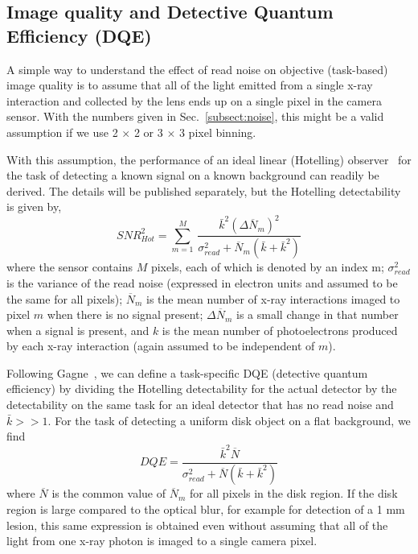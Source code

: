 \subsection{Image quality and Detective Quantum Efficiency (DQE)}
\label{subsect:image_quality_DQE}
A simple way to understand the effect of read noise on objective (task-based) image quality is to assume that all of the light emitted from a single x-ray interaction and collected by the lens ends up on a single pixel in the camera sensor. With the numbers given in Sec.~\ref{subsect:noise}, this might be a valid assumption if we use 2 $\times$ 2 or 3 $\times$ 3 pixel binning. 

With this assumption, the performance of an ideal linear (Hotelling) observer~\citep{Barrett2004} for the task of detecting a known signal on a known background can readily be derived. The details will be published separately, but the Hotelling detectability is given by,
%
\begin{equation}
SNR_{Hot}^2 = \sum\limits_{m=1}^{M}\, \frac{\bar{k}^2 (\Delta \overline{N}_m)^2}{\sigma_{read}^2 + \overline{N}_m (\bar{k} + \bar{k}^2)}
\label{eq:SNR2_hot}
\end{equation}
%
where the sensor contains $M$ pixels, each of which is denoted by an index m; $\sigma_{read}^2$ is the variance of the read noise (expressed in electron units and assumed to be the same for all pixels); $\overline{N}_m$ is the mean number of x-ray interactions imaged to pixel $m$ when there is no signal present; $\Delta \overline{N}_m$ is a small change in that number when a signal is present, and $k$ is the mean number of photoelectrons produced by each x-ray interaction (again assumed to be independent of $m$).

Following Gagne~\citep{Gagne2003}, we can define a task-specific DQE (detective quantum efficiency) by dividing the Hotelling detectability for the actual detector by the detectability on the same task for an ideal detector that has no read noise and $\bar{k}>> 1$.  For the task of detecting a uniform disk object on a flat background, we find
%
\begin{equation}
DQE = \frac{\bar{k}^2 \overline{N}}{\sigma_{read}^2 + \overline{N}(\bar{k} + \bar{k}^2)}
\label{eq:DQE}
\end{equation}
%
where $\overline{N}$ is the common value of $\overline{N}_m$ for all pixels in the disk region. If the disk region is large compared to the optical blur, for example for detection of a 1 mm lesion, this same expression is obtained even without assuming that all of the light from one x-ray photon is imaged to a single camera pixel.

